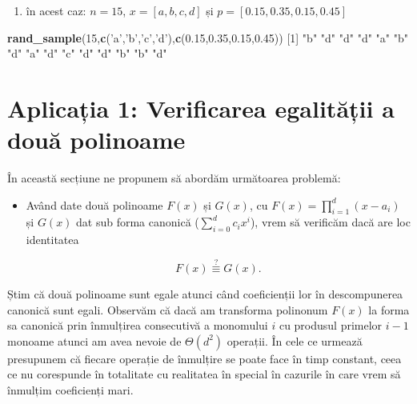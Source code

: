 \documentclass[]{article}
\newenvironment{Shaded}{\begin{snugshade}}{\end{snugshade}}
\newcommand{\KeywordTok}[1]{\textcolor[rgb]{0.13,0.29,0.53}{\textbf{#1}}}
\newcommand{\DecValTok}[1]{\textcolor[rgb]{0.00,0.00,0.81}{#1}}
\newcommand{\FloatTok}[1]{\textcolor[rgb]{0.00,0.00,0.81}{#1}}
\newcommand{\StringTok}[1]{\textcolor[rgb]{0.31,0.60,0.02}{#1}}
\newcommand{\NormalTok}[1]{#1}
\providecommand{\tightlist}{%
  \setlength{\itemsep}{0pt}\setlength{\parskip}{0pt}}
\newenvironment{frshaded*}{%
  \def\FrameCommand{\fboxrule=\FrameRule\fboxsep=\FrameSep \fcolorbox{framecolor}{shadecolor1}}%
  \MakeFramed {\advance\hsize-\width \FrameRestore}}%
{\endMakeFramed}
\newenvironment{rmdblock}[1]
  {\begin{frshaded*}
  \begin{itemize}
  \renewcommand{\labelitemi}{
    \raisebox{-.7\height}[0pt][0pt]{
      {\setkeys{Gin}{width=2em,keepaspectratio}\texttt{[image: images/icons/\#1]}}
    }
  }
  \item
  }
  {
  \end{itemize}
  \end{frshaded*}
  }
\newenvironment{rmdexercise}
  {\begin{rmdblock}{exercise}}
  {\end{rmdblock}}
\begin{document}
\begin{enumerate}
\def\labelenumi{\arabic{enumi}.}
\setcounter{enumi}{1}
\tightlist
\item
  în acest caz: \(n=15\), \(x=[a,b,c,d]\) și \(p=[0.15,0.35,0.15,0.45]\)
\end{enumerate}

\begin{Shaded}
\begin{Highlighting}[]
\KeywordTok{rand_sample}\NormalTok{(}\DecValTok{15}\NormalTok{,}\KeywordTok{c}\NormalTok{(}\StringTok{'a'}\NormalTok{,}\StringTok{'b'}\NormalTok{,}\StringTok{'c'}\NormalTok{,}\StringTok{'d'}\NormalTok{),}\KeywordTok{c}\NormalTok{(}\FloatTok{0.15}\NormalTok{,}\FloatTok{0.35}\NormalTok{,}\FloatTok{0.15}\NormalTok{,}\FloatTok{0.45}\NormalTok{))}
\NormalTok{ [}\DecValTok{1}\NormalTok{] }\StringTok{"b"} \StringTok{"d"} \StringTok{"d"} \StringTok{"d"} \StringTok{"a"} \StringTok{"b"} \StringTok{"d"} \StringTok{"a"} \StringTok{"d"} \StringTok{"c"} \StringTok{"d"} \StringTok{"d"} \StringTok{"b"} \StringTok{"b"} \StringTok{"d"}
\end{Highlighting}
\end{Shaded}

\section{Aplicația 1: Verificarea egalității a două
polinoame}\label{aplicatia-1-verificarea-egalitatii-a-doua-polinoame}

În această secțiune ne propunem să abordăm următoarea problemă:

\begin{rmdexercise}
Având date două polinoame \(F(x)\) și \(G(x)\), cu
\(F(x)=\prod_{i=1}^d(x-a_i)\) și \(G(x)\) dat sub forma canonică
(\(\sum_{i=0}^d c_ix^i\)), vrem să verificăm dacă are loc identitatea

\[
  F(x) \overset{?}{\equiv} G(x).
\]
\end{rmdexercise}

Știm că două polinoame sunt egale atunci când coeficienții lor în
descompunerea canonică sunt egali. Observăm că dacă am transforma
polinonum \(F(x)\) la forma sa canonică prin înmulțirea consecutivă a
monomului \(i\) cu produsul primelor \(i-1\) monoame atunci am avea
nevoie de \(\Theta(d^2)\) operații. În cele ce urmează presupunem că
fiecare operație de înmulțire se poate face în timp constant, ceea ce nu
corespunde în totalitate cu realitatea în special în cazurile în care
vrem să înmulțim coeficienți mari.
\end{document}

